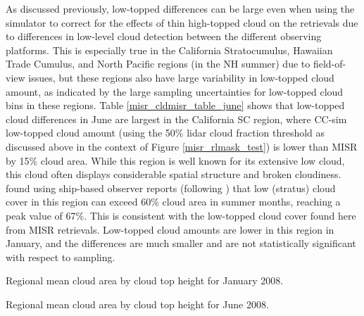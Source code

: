 As discussed previously, low-topped differences can be large even when using the simulator to correct for the effects of thin high-topped cloud on the retrievals due to differences in low-level cloud detection between the different observing platforms. This is especially true in the California Stratocumulus, Hawaiian Trade Cumulus, and North Pacific regions (in the NH summer) due to field-of-view issues, but these regions also have large variability in low-topped cloud amount, as indicated by the large sampling uncertainties for low-topped cloud bins in these regions. Table \ref{misr_cldmisr_table_june} shows that low-topped cloud differences in June are largest in the California SC region, where CC-sim low-topped cloud amount (using the 50\% lidar cloud fraction threshold as discussed above in the context of Figure \ref{misr_rlmask_test}) is lower than MISR by 15\% cloud area. While this region is well known for its extensive low cloud, this cloud often displays considerable spatial structure and broken cloudiness. \cite{klein_and_hartmann_1993} found using ship-based observer reports (following \cite{warren_et_al_1986, warren_et_al_1988}) that low (stratus) cloud cover in this region can exceed 60\% cloud area in summer months, reaching a peak value of 67\%. This is consistent with the low-topped cloud cover found here from MISR retrievals. Low-topped cloud amounts are lower in this region in January, and the differences are much smaller and are not statistically significant with respect to sampling.

\begin{table}
\centering
%
\caption{Regional mean cloud area by cloud top height for January 2008.}
\label{misr_cldmisr_table_january}
\end{table}

\begin{table}
\centering
%
\caption{Regional mean cloud area by cloud top height for June 2008.}
\label{misr_cldmisr_table_june}
\end{table}

